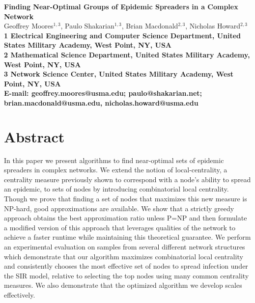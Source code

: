 

\begin{flushleft}
{\Large
\textbf{Finding Near-Optimal Groups of Epidemic Spreaders in a Complex Network}
}
\\
Geoffrey Moores$^{1,3}$, 
Paulo Shakarian$^{1,3}$, 
Brian Macdonald$^{2,3}$, 
Nicholas Howard$^{2,3}$
\\
\bf{1} Electrical Engineering and Computer Science Department, United States Military Academy, West Point, NY, USA
\\
\bf{2} Mathematical Science Department, United States Military Academy, West Point, NY, USA
\\
\bf{3} Network Science Center, United States Military Academy, West Point, NY, USA
\\

\noindent E-mail: geoffrey.moores@usma.edu; paulo@shakarian.net; brian.macdonald@usma.edu, nicholas.howard@usma.edu
\end{flushleft}

\section*{Abstract}
In this paper we present algorithms to find near-optimal sets of epidemic spreaders in complex networks.  We extend the notion of local-centrality, a centrality measure previously shown to correspond with a node's ability to spread an epidemic, to sets of nodes by introducing combinatorial local centrality.  Though we prove that finding a set of nodes that maximizes this new measure is NP-hard, good approximations are available.  We show that a strictly greedy approach obtains the best approximation ratio unless P=NP and then formulate a modified version of this approach that leverages qualities of the network to achieve a faster runtime while maintaining this theoretical guarantee.  We perform an experimental evaluation on samples from several different network structures which demonstrate that our algorithm maximizes combinatorial local centrality and consistently chooses the most effective set of nodes to spread infection under the SIR model, relative to selecting the top nodes using many common centrality measures.  We also demonstrate that the optimized algorithm we develop scales effectively.

